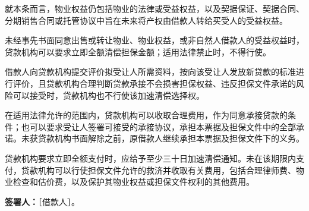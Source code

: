 \documentclass[UTF8,fontset=none,11pt,a4paper]{ctexart}
\begin{document}
就本条而言，物业权益仍包括物业的法律或受益权益，以及契据保证、契据合同、分期销售合同或托管协议中旨在未来将产权由借款人转给买受人的\allowbreak\mbox{受益权益。}


未经事先书面同意出售或转让物业、物业权益，或非自然人借款人的受益权益时，贷款机构可以要求立即全额清偿担保金额；适用法律禁止时，\allowbreak\mbox{不得行使。}


借款人向贷款机构提交评价拟受让人所需资料，按向该受让人发放新贷款的标准进行评价，且贷款机构合理判断贷款承接不会损害担保权益、违反担保文件承诺的风险可以接受时，贷款机构也不行使该加速清\allowbreak\mbox{偿选择权。}


在适用法律允许的范围内，贷款机构可以收取合理费用，作为同意承接贷款的条件；也可以要求受让人签署可接受的承接协议，承担本票据及担保文件中的全部承诺。未获贷款机构书面解除之前，原借款人继续承担本票据及担保文件\allowbreak\mbox{下的义务。}


贷款机构要求立即全额支付时，应给予至少三十日加速清偿通知。未在该期限内支付，贷款机构可以行使担保文件允许的救济并收取有关费用，包括合理律师费、物业检查和估价费，以及保护其物业权益或担保文件权利的\allowbreak\mbox{其他费用。}


\textbf{签署人：}［借款人］。
\end{document}
